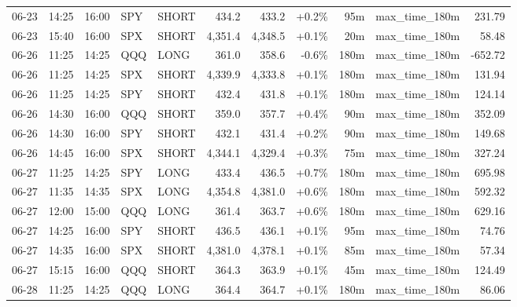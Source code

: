 \documentclass[11pt,a4paper,twoside]{article}
\begin{document}
\begin{center}
\begin{longtable}{>{\color{txtmain}}l l l l l r r r r >{\color{txtmain}}l r}
06-23 & 14:25 & 16:00 & SPY & SHORT & 434.2 & 433.2 & \textcolor{wingreen}{+0.2\%} & 95m & max\_time\_180m & \textcolor{wingreen}{231.79} \\
06-23 & 15:40 & 16:00 & SPX & SHORT & 4,351.4 & 4,348.5 & \textcolor{wingreen}{+0.1\%} & 20m & max\_time\_180m & \textcolor{wingreen}{58.48} \\
06-26 & 11:25 & 14:25 & QQQ & LONG & 361.0 & 358.6 & \textcolor{lossred}{-0.6\%} & 180m & max\_time\_180m & \textcolor{lossred}{-652.72} \\
06-26 & 11:25 & 14:25 & SPX & SHORT & 4,339.9 & 4,333.8 & \textcolor{wingreen}{+0.1\%} & 180m & max\_time\_180m & \textcolor{wingreen}{131.94} \\
06-26 & 11:25 & 14:25 & SPY & SHORT & 432.4 & 431.8 & \textcolor{wingreen}{+0.1\%} & 180m & max\_time\_180m & \textcolor{wingreen}{124.14} \\
06-26 & 14:30 & 16:00 & QQQ & SHORT & 359.0 & 357.7 & \textcolor{wingreen}{+0.4\%} & 90m & max\_time\_180m & \textcolor{wingreen}{352.09} \\
06-26 & 14:30 & 16:00 & SPY & SHORT & 432.1 & 431.4 & \textcolor{wingreen}{+0.2\%} & 90m & max\_time\_180m & \textcolor{wingreen}{149.68} \\
06-26 & 14:45 & 16:00 & SPX & SHORT & 4,344.1 & 4,329.4 & \textcolor{wingreen}{+0.3\%} & 75m & max\_time\_180m & \textcolor{wingreen}{327.24} \\
06-27 & 11:25 & 14:25 & SPY & LONG & 433.4 & 436.5 & \textcolor{wingreen}{+0.7\%} & 180m & max\_time\_180m & \textcolor{wingreen}{695.98} \\
06-27 & 11:35 & 14:35 & SPX & LONG & 4,354.8 & 4,381.0 & \textcolor{wingreen}{+0.6\%} & 180m & max\_time\_180m & \textcolor{wingreen}{592.32} \\
06-27 & 12:00 & 15:00 & QQQ & LONG & 361.4 & 363.7 & \textcolor{wingreen}{+0.6\%} & 180m & max\_time\_180m & \textcolor{wingreen}{629.16} \\
06-27 & 14:25 & 16:00 & SPY & SHORT & 436.5 & 436.1 & \textcolor{wingreen}{+0.1\%} & 95m & max\_time\_180m & \textcolor{wingreen}{74.76} \\
06-27 & 14:35 & 16:00 & SPX & SHORT & 4,381.0 & 4,378.1 & \textcolor{wingreen}{+0.1\%} & 85m & max\_time\_180m & \textcolor{wingreen}{57.34} \\
06-27 & 15:15 & 16:00 & QQQ & SHORT & 364.3 & 363.9 & \textcolor{wingreen}{+0.1\%} & 45m & max\_time\_180m & \textcolor{wingreen}{124.49} \\
06-28 & 11:25 & 14:25 & QQQ & LONG & 364.4 & 364.7 & \textcolor{wingreen}{+0.1\%} & 180m & max\_time\_180m & \textcolor{wingreen}{86.06} \\

\end{longtable}
\end{center}
\end{document}
